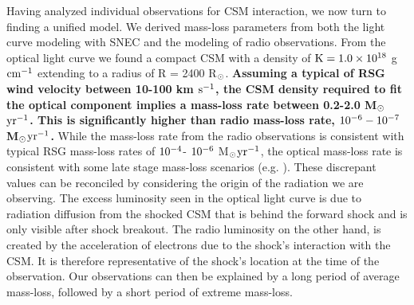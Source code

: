 \documentclass[a4paper,fleqn,usenatbib]{mnras}
\newcommand{\msunperiod}{M$\rm{_{\odot}}$}
\newcommand{\rsun}{R$\rm{_{\odot}}$}
\begin{document}
Having analyzed individual observations for CSM interaction, we now turn to finding a unified model.
We derived mass-loss parameters from both the light curve modeling with SNEC and the modeling of radio observations.
From the optical light curve we found a compact CSM with a density of $\rm{K = 1.0\times10^{18}}$ g $\rm{cm^{-1}}$ extending to a radius of R = 2400 \rsun. 
\textbf{Assuming a typical of RSG wind velocity between 10-100 km $\rm{s^{-1}}$, the CSM density required to fit the optical component implies a mass-loss rate between 0.2-2.0 \msunperiod $\rm{yr^{-1}}$.
This is significantly higher than radio mass-loss rate, $\rm{10^{-6}-10^{-7}}$ \msunperiod $\rm{yr^{-1}}$.}
While the mass-loss rate from the radio observations is consistent with typical RSG mass-loss rates of $\rm{10^{-4} }$- $\rm{10^{-6}}$ \msunperiod $\rm{yr^{-1}}$, the optical mass-loss rate is consistent with some late stage mass-loss scenarios (e.g. \citealt{2001chugai,2012quatert,2014shiode,2017fuller, 2017yaron}).
These discrepant values can be reconciled by considering the origin of the radiation we are observing.
The excess luminosity seen in the optical light curve is due to radiation diffusion from the shocked CSM that is behind the forward shock and is only visible after shock breakout.
The radio luminosity on the other hand, is created by the acceleration of electrons due to the shock's interaction with the CSM.
It is therefore representative of the shock's location at the time of the observation.
Our observations can then be explained by a long period of average mass-loss, followed by a short period of extreme mass-loss.
\end{document}
